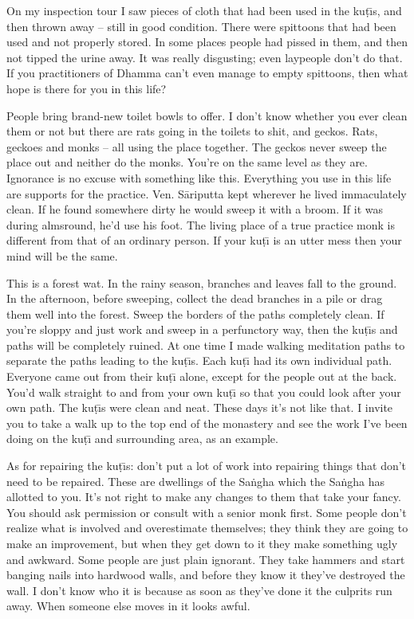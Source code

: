 On my inspection tour I saw pieces of cloth that had been used in the ku\d{t}\={\i}s, and then thrown away -- still in good condition. There were spittoons that had been used and not properly stored. In some places people had pissed in them, and then not tipped the urine away. It was really disgusting; even laypeople don't do that. If you practitioners of Dhamma can't even manage to empty spittoons, then what hope is there for you in this life?

People bring brand-new toilet bowls to offer. I don't know whether you ever clean them or not but there are rats going in the toilets to shit, and geckos. Rats, geckoes and monks -- all using the place together. The geckos never sweep the place out and neither do the monks. You're on the same level as they are. Ignorance is no excuse with something like this. Everything you use in this life are supports for the practice. Ven. S\=ariputta kept wherever he lived immaculately clean. If he found somewhere dirty he would sweep it with a broom. If it was during almsround, he'd use his foot. The living place of a true practice monk is different from that of an ordinary person. If your ku\d{t}\={\i} is an utter mess then your mind will be the same.

This is a forest wat. In the rainy season, branches and leaves fall to the ground. In the afternoon, before sweeping, collect the dead branches in a pile or drag them well into the forest. Sweep the borders of the paths completely clean. If you're sloppy and just work and sweep in a perfunctory way, then the ku\d{t}\={\i}s and paths will be completely ruined. At one time I made walking meditation paths to separate the paths leading to the ku\d{t}\={\i}s. Each ku\d{t}\={\i} had its own individual path. Everyone came out from their ku\d{t}\={\i} alone, except for the people out at the back. You'd walk straight to and from your own ku\d{t}\={\i} so that you could look after your own path. The ku\d{t}\={\i}s were clean and neat. These days it's not like that. I invite you to take a walk up to the top end of the monastery and see the work I've been doing on the ku\d{t}\={\i} and surrounding area, as an example.

As for repairing the ku\d{t}\={\i}s: don't put a lot of work into repairing things that don't need to be repaired. These are dwellings of the Sa\.ngha which the Sa\.ngha has allotted to you. It's not right to make any changes to them that take your fancy. You should ask permission or consult with a senior monk first. Some people don't realize what is involved and overestimate themselves; they think they are going to make an improvement, but when they get down to it they make something ugly and awkward. Some people are just plain ignorant. They take hammers and start banging nails into hardwood walls, and before they know it they've destroyed the wall. I don't know who it is because as soon as they've done it the culprits run away. When someone else moves in it looks awful.

